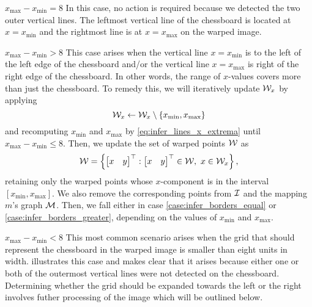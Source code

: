 \documentclass[../main.tex]{subfiles}
\begin{document}
\begin{caselist}
    \begin{case}{$x_\text{max}-x_\text{min}=8$}\label{case:infer_borders_equal}%
        In this case, no action is required because we detected the two outer vertical lines.
        The leftmost vertical line of the chessboard is located at $x=x_\text{min}$ and the rightmost line is at $x=x_\text{max}$ on the warped image.
    \end{case}

    \begin{case}{$x_\text{max}-x_\text{min}>8$}
        This case arises when the vertical line $x=x_\text{min}$ is to the left of the left edge of the chessboard and/or the vertical line $x=x_\text{max}$ is right of the right edge of the chessboard.
        In other words, the range of $x$-values covers more than just the chessboard.
        To remedy this, we will iteratively update ${\mathcal{W}}_x$ by applying
        \begin{equation*}
            {\mathcal{W}}_x \gets {\mathcal{W}}_x \setminus \{x_\text{min},x_\text{max}\}
        \end{equation*}
        and recomputing $x_\text{min}$ and $x_\text{max}$ by \cref{eq:infer_lines_x_extrema}
        until $x_\text{max}-x_\text{min}\leq 8$.
        Then, we update the set of warped points ${\mathcal{W}}$ as
        \begin{equation*}
            {\mathcal{W}} = \left\{
                \begin{bmatrix}
                    x & y
                \end{bmatrix}^\top
                :
                \begin{bmatrix}
                    x & y
                \end{bmatrix}^\top
                \in {\mathcal{W}}, \ x \in {\mathcal{W}}_x
            \right\},
        \end{equation*}
        retaining only the warped points whose $x$-component is in the interval $[x_\text{min},x_\text{max}]$.
        We also remove the corresponding points from ${\mathcal{I}}$ and the mapping $m$'s graph ${\mathcal{M}}$.
        Then, we fall either in case \ref{case:infer_borders_equal} or \ref{case:infer_borders_greater}, depending on the values of $x_\text{min}$ and $x_\text{max}$.
    \end{case}

    \begin{case}{$x_\text{max}-x_\text{min}<8$}\label{case:infer_borders_greater}%
        This most common scenario arises when the grid that should represent the chessboard in the warped image is smaller than eight units in width.
         illustrates this case and makes clear that it arises because either one or both of the outermost vertical lines were not detected on the chessboard. 
        Determining whether the grid should be expanded towards the left or the right involves futher processing of the image which will be outlined below.
        

\end{case}
\end{caselist}
\end{document}
